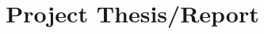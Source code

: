 \documentclass[a4paper,12pt,twoside]{book}
\begin{document}
\title{Project Thesis/Report}



\author{} 
\date{}
\date{}
\maketitle

\tableofcontents





\end{document}
